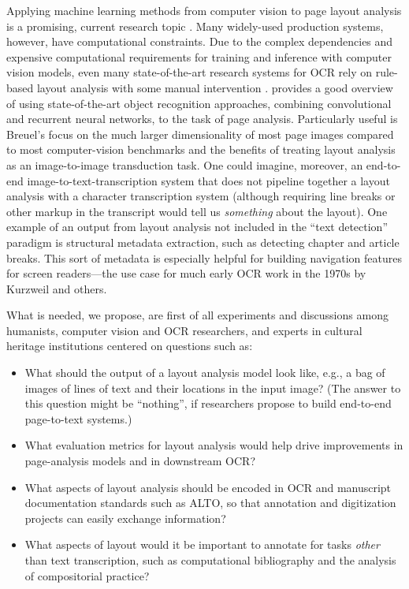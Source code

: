 \documentclass[twoside,11pt]{report}
\begin{document}
Applying machine learning methods from computer vision to page layout analysis is a promising, current research topic \citep[e.g.,][]{meier17:_fully_convol_neural_networ_newsp_artic_segmen,xu17:_page_segmen_histor_handw_docum,oliveira18}. Many widely-used production systems, however, have computational constraints. Due to the complex dependencies and expensive computational requirements for training and inference with computer vision models, even many state-of-the-art research systems for OCR rely on rule-based layout analysis with some manual intervention \citep{reul17:_larex}. \cite{breuel17:_robus_simpl_page_segmen_hybrid} provides a good overview of using state-of-the-art object recognition approaches, combining convolutional and recurrent neural networks, to the task of page analysis. Particularly useful is Breuel's focus on the much larger dimensionality of most page images compared to most computer-vision benchmarks and the benefits of treating layout analysis as an image-to-image transduction task. One could imagine, moreover, an end-to-end image-to-text-transcription system that does not pipeline together a layout analysis with a character transcription system (although requiring line breaks or other markup in the transcript would tell us \emph{something} about the layout). One example of an output from layout analysis not included in the ``text detection'' paradigm is structural metadata extraction, such as detecting chapter and article breaks. This sort of metadata is especially helpful for building navigation features for screen readers---the use case for much early OCR work in the 1970s by Kurzweil and others.

What is needed, we propose, are first of all experiments and discussions among humanists, computer vision and OCR researchers, and experts in cultural heritage institutions centered on questions such as:
\begin{itemize}

\item What should the output of a layout analysis model look like, e.g., a bag of images of lines of text and their locations in the input image? (The answer to this question might be ``nothing'', if researchers propose to build end-to-end page-to-text systems.)

\item What evaluation metrics for layout analysis would help drive improvements in page-analysis models and in downstream OCR?

\item What aspects of layout analysis should be encoded in OCR and manuscript documentation standards such as ALTO, so that annotation and digitization projects can easily exchange information?

\item What aspects of layout would it be important to annotate for tasks \emph{other} than text transcription, such as computational bibliography and the analysis of compositorial practice?

\end{itemize}
\end{document}
